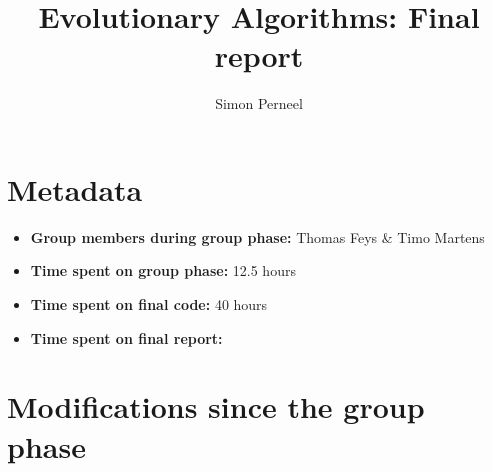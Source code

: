 \documentclass[a4paper,10pt]{article}
\title{Evolutionary Algorithms: Final report}
\author{Simon Perneel}
\newcommand{\nextyear}{\advance\year by 1 \the\year\advance\year by -1}
\newcommand{\deadlineReport}{January 4, \nextyear{} at 16:00 CET}
\newcommand{\RemoveMe}[1]{{\color{purple}#1}}
\begin{document}
\selectfont{}
\setlength\parindent{0pt} %

\maketitle





\section{Metadata}

\begin{itemize}
 \item \textbf{Group members during group phase:} Thomas Feys \& Timo Martens
 \item \textbf{Time spent on group phase:} 12.5 hours
 \item \textbf{Time spent on final code:} 40 hours
 \item \textbf{Time spent on final report:} %
\end{itemize}

\section{Modifications since the group phase}
\end{document}
